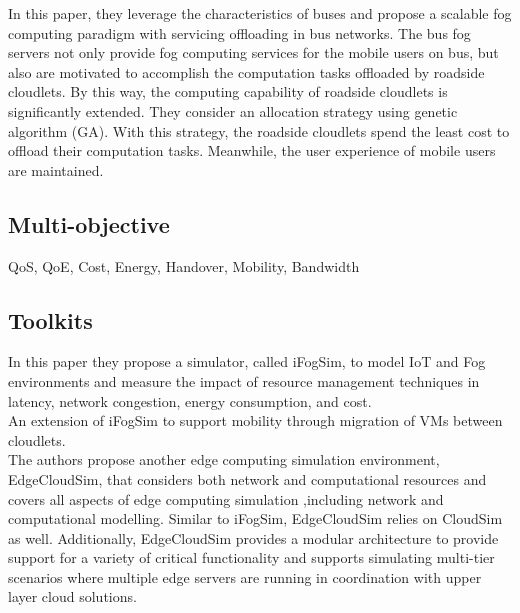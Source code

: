 \cite{ye2016scalable}
In this paper, they leverage the characteristics of buses and propose a scalable fog computing paradigm with servicing offloading in bus networks. The bus fog servers not only provide fog computing services for the mobile users on bus, but also are motivated to accomplish the computation tasks offloaded by roadside cloudlets. By this way, the computing capability of roadside cloudlets is significantly extended. They consider an allocation strategy using genetic algorithm (GA). With this strategy, the roadside cloudlets spend the least cost to offload their computation tasks. Meanwhile, the user experience of mobile users are maintained.





\subsection{Multi-objective}
\label{sec:Multiobjective}
QoS, QoE, Cost, Energy, Handover, Mobility, Bandwidth
\subsection{Toolkits}
\label{sec:Toolkits}

\cite{gupta2017ifogsim}
In this paper they propose a simulator, called iFogSim, to model IoT and Fog environments and measure the impact of resource management techniques in latency, network congestion, energy consumption, and cost.\\

\cite{Lopes2017}
An extension of iFogSim to support mobility through migration of VMs between cloudlets.\\

\cite{sonmez2017edgecloudsim}
The authors propose another edge computing simulation environment, EdgeCloudSim, that considers both network and computational resources and covers all aspects of edge computing simulation ,including network and computational modelling. Similar to iFogSim, EdgeCloudSim relies on CloudSim as well. Additionally, EdgeCloudSim provides a modular architecture to provide support for a variety of critical functionality and supports simulating multi-tier scenarios where multiple edge servers are running in coordination with upper layer cloud solutions.

\vfill\pagebreak
